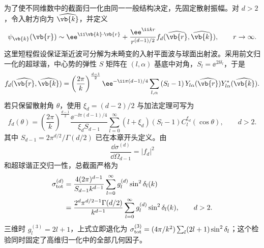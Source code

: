 为了使不同维数中的截面归一化由同一一般结构决定，先固定散射振幅。对 $d>2$，令入射方向为 $\widehat{\vb{k}}$，并定义
\begin{equation}
\psi_{\vb{k}}(\vb{r})
\sim
\ee^{\ii\vb{k}\cdot\vb{r}}
+\frac{\ee^{\ii kr}}{r^{(d-1)/2}}
 f_d(\widehat{\vb{r}},\widehat{\vb{k}}),
\qquad r\to\infty.
\label{eq:phys-hdqm-d-scattering-amplitude-convention}
\end{equation}
这里短程假设保证渐近波可分解为未畸变的入射平面波与球面出射波。采用前文归一化的超球谐，中心势的弹性 $S$ 矩阵在 $(l,\alpha)$ 基底中对角，$S_l=\ee^{2\ii\delta_l}$，于是
\begin{equation}
 f_d(\widehat{\vb{r}},\widehat{\vb{k}})
 =\left(\frac{2\pi}{k}\right)^{\frac{d-1}{2}}
 \ee^{-\ii\pi(d-1)/4}
 \sum_{l,\alpha}
 \left(S_l-1\right)
 Y_{l\alpha}(\widehat{\vb{r}})Y_{l\alpha}^*(\widehat{\vb{k}}).
\label{eq:phys-hdqm-d-partial-wave-amplitude}
\end{equation}
若只保留散射角 $\theta$，使用 $\xi_d=(d-2)/2$ 与加法定理可写为
\begin{equation}
 f_d(\theta)
 =\left(\frac{2\pi}{k}\right)^{\frac{d-1}{2}}
 \frac{\ee^{-\ii\pi(d-1)/4}}{\xi_d S_{d-1}}
 \sum_{l=0}^{\infty}(l+\xi_d)
 \left(S_l-1\right)C_l^{\xi_d}(\cos\theta),
 \qquad d>2.
\label{eq:phys-hdqm-d-central-partial-amplitude}
\end{equation}
其中 $S_{d-1}=2\pi^{d/2}/\Gamma(d/2)$ 已在本章开头定义。由
\[
\frac{\dd\sigma^{(d)}}{\dd\Omega_{d-1}}=|f_d|^2
\]
和超球谐正交归一性，总截面严格为
\begin{equation}
\begin{aligned}
\sigma_{\rm tot}^{(d)}
&=\frac{4(2\pi)^{d-1}}{S_{d-1}k^{d-1}}
\sum_{l=0}^{\infty}g_l^{(d)}\sin^2\delta_l(k)\\
&=\frac{2^d\pi^{d/2-1}\Gamma(d/2)}{k^{d-1}}
\sum_{l=0}^{\infty}g_l^{(d)}\sin^2\delta_l(k),
\qquad d>2.
\end{aligned}
\label{eq:phys-hdqm-d-cross-section}
\end{equation}
三维时 $g_l^{(3)}=2l+1$，上式立即退化为 $\sigma_{\rm tot}^{(3)}=(4\pi/k^2)\sum_l(2l+1)\sin^2\delta_l$；这个检验同时固定了高维归一化中的全部几何因子。

